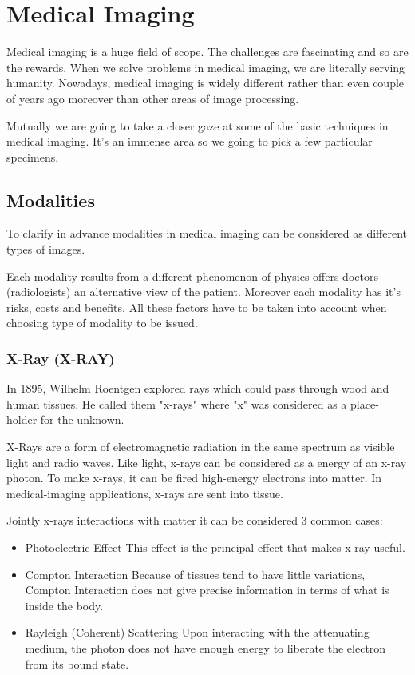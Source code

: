 \chapter{Medical Imaging}
\label{ch:rworks}

Medical imaging is a huge field of scope. The challenges are fascinating and so are the rewards. When we solve problems in medical imaging, we are literally serving humanity. Nowadays, medical imaging is widely different rather than even couple of years ago moreover than other areas of image processing. 

Mutually we are going to take a closer gaze at some of the basic techniques in medical imaging. It's an immense area so we going to pick a few particular specimens.

\section{Modalities}
To clarify in advance modalities in medical imaging can be considered as different types of images.

Each modality results from a different phenomenon of physics offers doctors (radiologists) an alternative view of the patient. Moreover each modality has it's risks, costs and benefits. All these factors have to be taken into account when choosing type of modality to be issued.

\subsection{X-Ray (X-RAY)}
In 1895, Wilhelm Roentgen explored rays which could pass through wood and human tissues. He called them \cite{Barker1996} "x-rays" where "x" was considered as a place-holder for the unknown.

X-Rays are a form of electromagnetic radiation in the same spectrum as visible light and radio waves. Like light, x-rays can be considered as a energy of an x-ray photon. To make x-rays, it can be fired high-energy electrons into matter. In medical-imaging applications, x-rays are sent into tissue. 

Jointly x-rays interactions with matter it can be considered 3 common cases:
\begin{itemize}
    \item Photoelectric Effect
    \newline This effect is the principal effect that makes x-ray useful.
    \item Compton Interaction
    \newline Because of tissues tend to have little variations, Compton Interaction does not give precise information in terms of what is inside the body. 
    \item Rayleigh (Coherent) Scattering
    \newline Upon interacting with the attenuating medium, the photon does not have enough energy to liberate the electron from its bound state.
\end{itemize}

